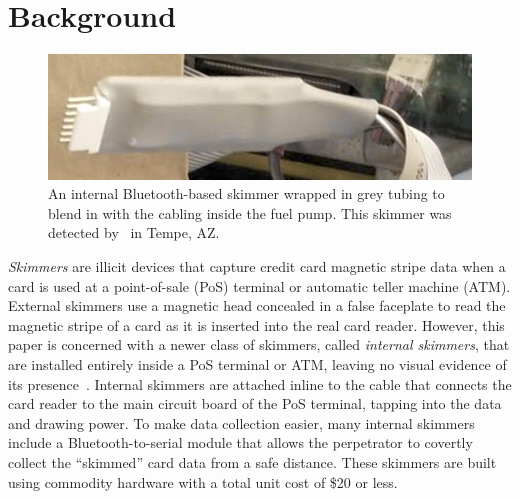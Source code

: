 


%

\section{Background}
\label{sec:background}

\begin{figure}
    \includegraphics[width=0.95\linewidth]{skimmer/fig/wrapped-skimmer}
    \caption{An internal Bluetooth-based skimmer wrapped in grey tubing to blend in with the cabling inside the fuel pump. This skimmer
    was detected by \bluetana\ in Tempe, AZ.
}
\label{fig:wrapped-skimmer}
\end{figure}

\emph{Skimmers} are illicit devices that capture credit card magnetic stripe data when a card is used at a point-of-sale (PoS) terminal or automatic teller machine (ATM). External skimmers use a magnetic head concealed in a false
faceplate to read the magnetic stripe of a card as it is inserted into the real card reader. However, this paper is concerned
with a newer class of skimmers, called \emph{internal skimmers}, that are installed entirely inside a PoS
terminal or ATM, leaving no visual evidence of its presence~\cite{skimreaper2018}. Internal skimmers are attached inline to the cable that connects the
card reader to the main circuit board of the PoS terminal, tapping into the data and drawing power.
%
To make data collection easier, many internal skimmers include a Bluetooth-to-serial module that allows the
perpetrator to covertly collect the ``skimmed'' card data from a safe distance.
%
These skimmers are built using commodity hardware with a total unit cost of \$20 or less.

